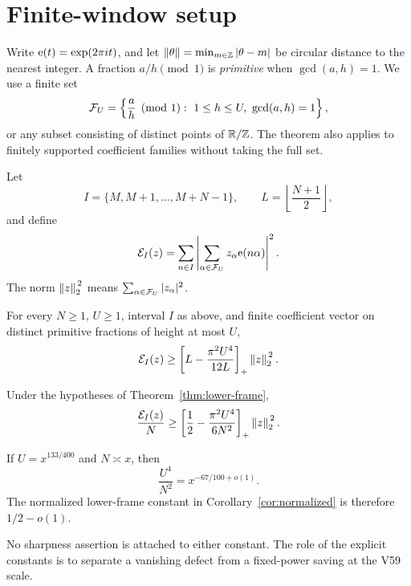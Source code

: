 \section{Finite-window setup}
\label{sec:setup}

Write \(\mathrm{e}(t)=\exp(2\pi i t)\), and let
\(\left\lVert \theta\right\rVert=\min_{m\in\mathbb Z}|\theta-m|\) be circular distance to the
nearest integer.  A fraction \(a/h\pmod1\) is \emph{primitive} when
\(\gcd(a,h)=1\).  We use a finite set
\[
\mathcal{F}_{U}=\left\{\frac ah\pmod1:\ 1\leq h\leq U,\ \gcd(a,h)=1\right\},
\]
or any subset consisting of distinct points of \(\mathbb{R}/\mathbb{Z}\).  The theorem also
applies to finitely supported coefficient families without taking the full
set.

Let
\[
I=\{M,M+1,\ldots,M+N-1\},\qquad
L=\left\lfloor\frac{N+1}{2}\right\rfloor,
\]
and define
\[
\mathcal{E}_I(z)=
\sum_{n\in I}\left|\sum_{\alpha\in\mathcal{F}_{U}}z_\alpha\mathrm{e}(n\alpha)\right|^2.
\]
The norm \(\left\lVert z\right\rVert_{2}^{\,2}\) means
\(\sum_{\alpha\in\mathcal{F}_{U}}|z_\alpha|^2\).

\begin{theorem}
\label{thm:lower-frame}
For every \(N\geq1\), \(U\geq1\), interval \(I\) as above, and finite
coefficient vector on distinct primitive fractions of height at most \(U\),
\[
\mathcal{E}_I(z)\geq
\left[L-\frac{\pi^2U^4}{12L}\right]_{+}\left\lVert z\right\rVert_{2}^{\,2}.
\]
\end{theorem}

\begin{corollary}
\label{cor:normalized}
Under the hypotheses of Theorem~\ref{thm:lower-frame},
\[
\frac{\mathcal{E}_I(z)}{N}\geq
\left[\frac12-\frac{\pi^2U^4}{6N^2}\right]_{+}\left\lVert z\right\rVert_{2}^{\,2}.
\]
\end{corollary}

\begin{corollary}[V59 specialization]
\label{cor:v59}
If \(U=x^{133/400}\) and \(N\asymp x\), then
\[
\frac{U^4}{N^2}=x^{-67/100+o(1)}.
\]
The normalized lower-frame constant in
Corollary~\ref{cor:normalized} is therefore \(1/2-o(1)\).
\end{corollary}

No sharpness assertion is attached to either constant.  The role of the
explicit constants is to separate a vanishing defect from a fixed-power
saving at the V59 scale.

